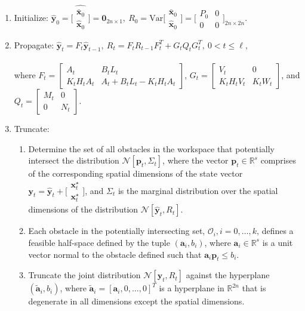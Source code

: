 \documentclass[letterpaper]{article}
\begin{document}
\begin{enumerate}
\item Initialize: $\hat{\mathbf{y}}_0 = \widehat{\bigl[ \begin{smallmatrix} \bar{\mathbf{x}}_0 \\ \hat{\mathbf{x}}_0 \end{smallmatrix} \bigr]} = \mathbf{0}_{2n \times 1}, ~ R_0 = \mathrm{Var} \bigl[ \begin{smallmatrix} \bar{\mathbf{x}}_0 \\ \hat{\mathbf{x}}_0 \end{smallmatrix} \bigr] = \bigl[ \begin{smallmatrix} P_0&0\\0&0 \end{smallmatrix} \bigr]_{2n \times 2n}$.
\item Propagate: $\hat{\mathbf{y}}_t = F_t\hat{\mathbf{y}}_{t-1}, ~ R_t = F_t R_{t-1}F_t^T + G_t Q_t G_t^T, ~ 0 < t \leq \ell,$ \\ \\ where $F_t = \begin{bmatrix} A_t & B_t L_t\\ K_t H_t A_t & A_t + B_t L_t - K_t H_t A_t \end{bmatrix}$, $G_t = \begin{bmatrix} V_t & 0\\ K_t H_t V_t & K_t W_t \end{bmatrix}$, and $Q_t = \begin{bmatrix} M_t & 0\\ 0 & N_t \end{bmatrix}$.
\item Truncate: 
\begin{enumerate}
\item Determine the set of all obstacles in the workspace that potentially intersect the distribution $\mathcal{N}[\mathbf{p}_t, \Sigma_t]$, where the vector $\mathbf{p}_t \in \mathbb{R}^s$ comprises of the corresponding spatial dimensions of the state vector $\mathbf{y}_t = \hat{\mathbf{y}}_t + \bigl[ \begin{smallmatrix} \mathbf{x}^{\star}_t \\ \mathbf{x}^{\star}_t \end{smallmatrix} \bigr]$, and $\Sigma_t$ is the marginal distribution over the spatial dimensions of the distribution $\mathcal{N}[\hat{\mathbf{y}}_t, R_t]$.
\item Each obstacle in the potentially intersecting set, $\mathcal{O}_i, i = 0, \ldots, k$, defines a feasible half-space defined by the tuple $(\mathbf{a}_i, b_i)$, where $\mathbf{a}_i \in \mathbb{R}^s$ is a unit vector normal to the obstacle defined such that $\mathbf{a}_i \mathbf{p}_t \leq b_i$.
\item Truncate the joint distribution $\mathcal{N}[\mathbf{y}_t, R_t]$ against the hyperplane $(\tilde{\mathbf{a}}_i, b_i)$, where $\tilde{\mathbf{a}}_i = [\mathbf{a}_i, 0, \ldots, 0]^T$ is a hyperplane in $\mathbb{R}^{2n}$ that is degenerate in all dimensions except the spatial dimensions.
    

\end{enumerate}
\end{enumerate}
\end{document}
